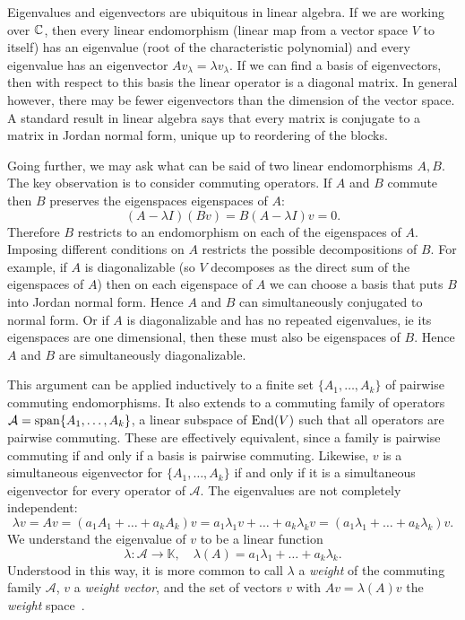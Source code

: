 Eigenvalues and eigenvectors are ubiquitous in linear algebra.
If we are working over $\mathbb{C}$, then every linear endomorphism (linear map from a vector space $V$ to itself) has an eigenvalue (root of the characteristic polynomial) and every eigenvalue has an eigenvector $Av_\lambda = \lambda v_\lambda$.
If we can find a basis of eigenvectors, then with respect to this basis the linear operator is a diagonal matrix.
In general however, there may be fewer eigenvectors than the dimension of the vector space.
A standard result in linear algebra says that every matrix is conjugate to a matrix in Jordan normal form, unique up to reordering of the blocks.

Going further, we may ask what can be said of two linear endomorphisms $A,B$.
The key observation is to consider commuting operators.
If $A$ and $B$ commute then $B$ preserves the eigenspaces  eigenspaces of $A$:
\[
(A- \lambda I) (Bv) 
= B(A- \lambda I) v
= 0.
\]
Therefore $B$ restricts to an endomorphism on each of the eigenspaces of $A$.
Imposing different conditions on $A$ restricts the possible decompositions of $B$.
For example, if $A$ is diagonalizable (so $V$ decomposes as the direct sum of the eigenspaces of $A$) then on each eigenspace of $A$ we can choose a basis that puts $B$ into Jordan normal form.
Hence $A$ and $B$ can simultaneously conjugated to normal form.
Or if $A$ is diagonalizable and has no repeated eigenvalues, ie its eigenspaces are one dimensional, then these must also be eigenspaces of $B$.
Hence $A$ and $B$ are simultaneously diagonalizable.

This argument can be applied inductively to a finite set $\{A_1,\dots,A_k\}$ of pairwise commuting endomorphisms.
It also extends to a commuting family of operators $\mathcal{A} = \operatorname{span}\{A_1,\dots,A_k\}$, a linear subspace of $\operatorname{End}(V)$ such that all operators are pairwise commuting.
These are effectively equivalent, since a family is pairwise commuting if and only if a basis is pairwise commuting.
Likewise, $v$ is a simultaneous eigenvector for $\{A_1,\dots,A_k\}$ if and only if it is a simultaneous eigenvector for every operator of $\mathcal{A}$.
The eigenvalues are not completely independent:
\[
\lambda v
= Av 
= (a_1A_1 + \dots + a_kA_k)v
= a_1 \lambda_1 v + \dots + a_k \lambda_k v
= (a_1 \lambda_1 + \dots + a_k \lambda_k )v.
\]
We understand the eigenvalue of $v$ to be a linear function 
\[
\lambda : \mathcal{A} \to \mathbb{K}, 
\quad
\lambda(A) = a_1 \lambda_1 + \dots + a_k \lambda_k .
\]
Understood in this way, it is more common to call $\lambda$ a \emph{weight} of the commuting family $\mathcal{A}$, $v$ a \emph{weight vector}, and the set of vectors $v$ with $Av = \lambda(A)v$ the \emph{weight} space~\cite[Definition~A.14]{Hall2015}.

